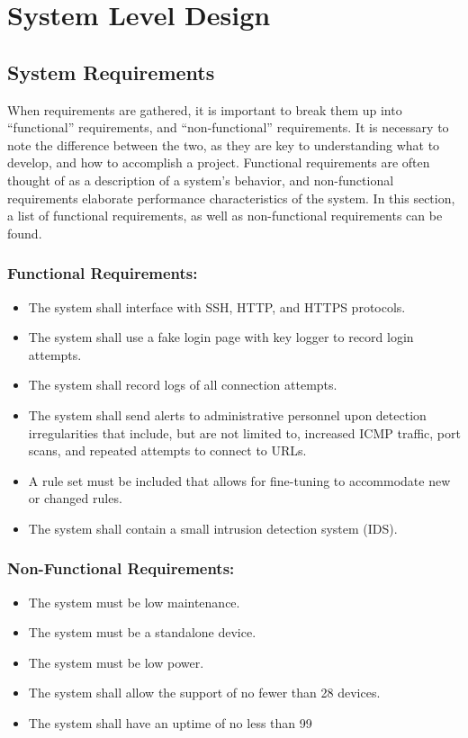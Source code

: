 \chapter{System Level Design}

\blindtext
\section{System Requirements}
When requirements are gathered, it is important to break them up into “functional” requirements, and “non-functional” requirements. It is necessary to note the difference between the two, as they are key to understanding what to develop, and how to accomplish a project. Functional requirements are often thought of as a description of a system’s behavior, and non-functional requirements elaborate performance characteristics of the system. In this section, a list of functional requirements, as well as non-functional requirements can be found.

\subsection{Functional Requirements:}
\begin{itemize}
\item The system shall interface with SSH, HTTP, and HTTPS protocols.
\item The system shall use a fake login page with key logger to record login attempts.
\item The system shall record logs of all connection attempts.
\item The system shall send alerts to administrative personnel upon detection irregularities that include, but are not limited to, increased ICMP traffic, port scans, and repeated attempts to connect to URLs.
\item A rule set must be included that allows for fine-tuning to accommodate new or changed rules.
\item The system shall contain a small intrusion detection system (IDS).
\end{itemize}

\subsection{Non-Functional Requirements:}
\begin{itemize}
\item The system must be low maintenance.
\item The system must be a standalone device.
\item The system must be low power.
\item The system shall allow the support of no fewer than 28 devices.
\item The system shall have an uptime of no less than 99%
\end{itemize}

